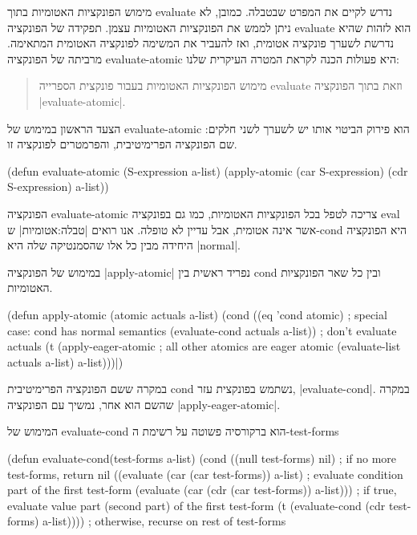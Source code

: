 מימוש הפונקציות האטומיות בתוך evaluate נדרש לקיים את המפרט שבטבלה. כמובן, לא
ניתן לממש את הפונקציות האטומיות עצמן. תפקידה של הפונקציה evaluate הוא לזהות
שהיא נדרשת לשערך פונקציה אטומית, ואז להעביר את המשימה לפונקציה האטומית המתאימה.
מרביתה של הפונקציה evaluate-atomic היא פעולות הכנה לקראת המטרה העיקרית שלנו:
\begin{quote}
  מימוש הפונקציות האטומיות בעבור פונקצית הספרייה evaluate וזאת בתוך הפונקציה
  \E|evaluate-atomic|.
\end{quote}

הצעד הראשון במימוש של evaluate-atomic הוא פירוק הביטוי אותו יש לשערך לשני
חלקים: שם הפונקציה הפרימיטיבית, והפרמטרים לפונקציה זו.
\begin{KERNEL}
(defun evaluate-atomic (S-expression a-list)
  (apply-atomic (car S-expression) (cdr S-expression) a-list))
\end{KERNEL}

הפונקציה evaluate-atomic צריכה לטפל בכל הפונקציות האטומיות, כמו גם בפונקציה
eval אשר אינה אטומית, אבל עדיין לא טופלה. אנו רואים |טבלה:אטומיות| ש-cond
היא הפונקציה היחידה מבין כל אלו שהסמנטיקה שלה היא \E|normal|.

\minipage\textwidth
במימוש של הפונקציה \E|apply-atomic| נפריד ראשית בין cond ובין כל שאר הפונקציות
האטומיות.
\begin{KERNEL}
(defun apply-atomic (atomic actuals a-list)
  (cond ((eq 'cond atomic) ; special case: cond has normal semantics
            (evaluate-cond actuals a-list)) ; don't evaluate actuals
        (t (apply-eager-atomic ; all other atomics are eager
              atomic
              (evaluate-list actuals a-list)
              a-list)))|)
\end{KERNEL}
\endminipage

במקרה ששם הפונקציה הפרימיטיבית cond נשתמש בפונקצית עזר, \E|evaluate-cond|. במקרה
שהשם הוא אחר, נמשיך עם הפונקציה \E|apply-eager-atomic|.

המימוש של evaluate-cond הוא ברקורסיה פשוטה על רשימת ה-test-forms
\begin{KERNEL}
(defun evaluate-cond(test-forms a-list)
  (cond ((null test-forms) nil) ; if no more test-forms, return nil
        ((evaluate (car (car test-forms)) a-list) ; evaluate condition part of the first test-form
        (evaluate (car (cdr (car test-forms)) a-list))) ; if true, evaluate value part (second part) of the first test-form
        (t (evaluate-cond (cdr test-forms) a-list)))) ; otherwise, recurse on rest of test-forms
\end{KERNEL}

